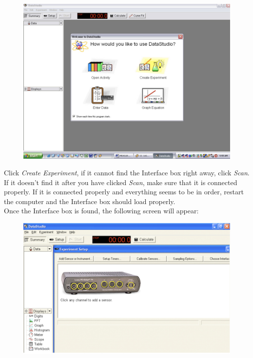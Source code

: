 \begin{figure}[ht]
  \centerline{\includegraphics[scale=0.45]{resources/photo2.jpg}}
\end{figure}

\newpage Click \emph{Create Experiment}, if it cannot find the Interface box right away, click \emph{Scan}.
If it doesn’t find it after you have clicked \emph{Scan}, make sure that it is connected properly.
If it is connected properly and everything seems 
to be in order, restart the computer and the Interface box should load properly.\\
Once the Interface box is found, the following screen will appear:

\begin{figure}[ht]
  \centerline{\includegraphics[scale=0.4]{resources/photo3.jpg}}
\end{figure}

